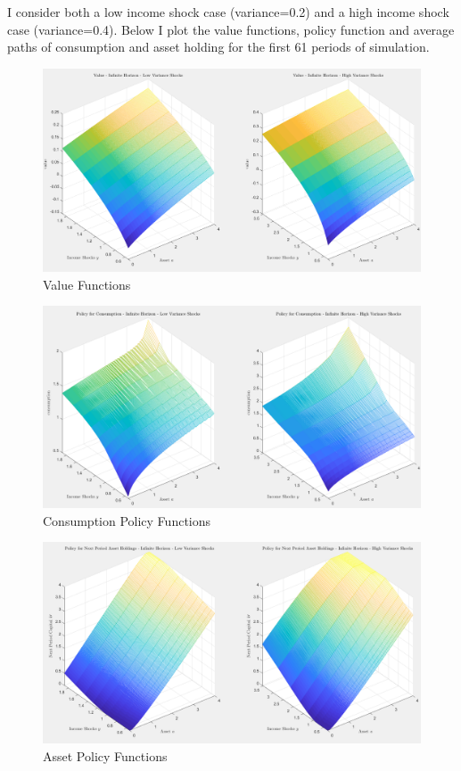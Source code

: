 \documentclass[thmsa,10pt]{article}
\begin{document}
I consider both a low income shock case (variance=0.2) and a high income shock case (variance=0.4). Below I plot the value functions, policy function and average paths of consumption and asset holding for the first 61 periods of simulation.
\begin{figure}[h!]
\centering
\caption{Value Functions}
\includegraphics[width=12cm]{./figs/value}
\end{figure}
\begin{figure}[h!]
\centering
\caption{Consumption Policy Functions}
\includegraphics[width=12cm]{./figs/consumption}
\end{figure}
\begin{figure}[h!]
\centering
\caption{Asset Policy Functions}
\includegraphics[width=12cm]{./figs/asset}
\end{figure}
\end{document}
